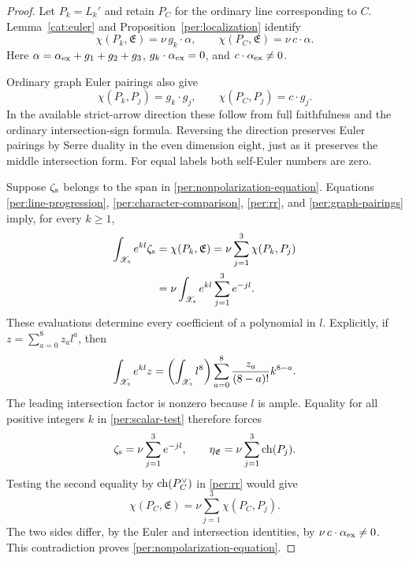 \begin{proof}
Let $P_k=L_k'$ and retain $P_C$ for the ordinary line corresponding
to $C$.  Lemma~\ref{cat:euler} and
Proposition~\ref{per:localization} identify
\[
 \chi(P_k,\mathfrak E)=\nu\,g_k\cdot\alpha,
 \qquad
 \chi(P_C,\mathfrak E)=\nu\,c\cdot\alpha.
\]
Here $\alpha=\alpha_{\rm ex}+g_1+g_2+g_3$,
$g_k\cdot\alpha_{\rm ex}=0$, and
$c\cdot\alpha_{\rm ex}\ne0$.

Ordinary graph Euler pairings also give
\begin{equation}
 \chi(P_k,P_j)=g_k\cdot g_j,
 \qquad
 \chi(P_C,P_j)=c\cdot g_j.
 \label{per:graph-pairings}
\end{equation}
In the available strict-arrow direction these follow from full
faithfulness and the ordinary intersection-sign formula.  Reversing
the direction preserves Euler pairings by Serre duality in the even
dimension eight, just as it preserves the middle intersection form.
For equal labels both self-Euler numbers are zero.

Suppose $\zeta_{\rm s}$ belongs to the span in
\eqref{per:nonpolarization-equation}.  Equations
\eqref{per:line-progression}, \eqref{per:character-comparison},
\eqref{per:rr}, and \eqref{per:graph-pairings} imply, for every
$k\ge1$,
\begin{align}
 \int_{\mathscr X_{\rm s}}e^{kl}\zeta_{\rm s}
   &=\chi(P_k,\mathfrak E)
     =\nu\sum_{j=1}^3\chi(P_k,P_j)\notag\\
   &=\nu\int_{\mathscr X_{\rm s}}
                         e^{kl}\sum_{j=1}^3e^{-jl}.
 \label{per:scalar-test}
\end{align}
These evaluations determine every coefficient of a polynomial in
$l$.  Explicitly, if $z=\sum_{a=0}^8z_al^a$, then
\[
 \int_{\mathscr X_{\rm s}}e^{kl}z
    =\left(\int_{\mathscr X_{\rm s}}l^8\right)
       \sum_{a=0}^8\frac{z_a}{(8-a)!}k^{8-a}.
\]
The leading intersection factor is nonzero because $l$ is ample.
Equality for all positive integers $k$ in \eqref{per:scalar-test}
therefore forces
\[
 \zeta_{\rm s}=\nu\sum_{j=1}^3e^{-jl},
 \qquad
 \eta_{\mathfrak E}=\nu\sum_{j=1}^3\operatorname{ch}(P_j).
\]
Testing the second equality by $\operatorname{ch}(P_C^\vee)$ in
\eqref{per:rr} would give
\[
 \chi(P_C,\mathfrak E)=\nu\sum_{j=1}^3\chi(P_C,P_j).
\]
The two sides differ, by the Euler and intersection identities,
by $\nu\,c\cdot\alpha_{\rm ex}\ne0$.  This contradiction proves
\eqref{per:nonpolarization-equation}.
\end{proof}
